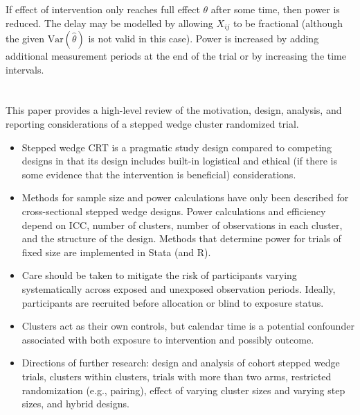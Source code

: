 \documentclass{article}
\newcommand{\Var}{\mathrm{Var}}
\begin{document}
If effect of intervention only reaches full effect $\theta$ after some time, then power is reduced. The delay may be modelled by allowing $X_{ij}$ to be fractional (although the given $\Var(\hat{\theta})$ is not valid in this case). Power is increased by adding additional measurement periods at the end of the trial or by increasing the time intervals.


\newpage


\section{\textcite{Hemming:2015}}

This paper provides a high-level review of the motivation, design, analysis, and reporting considerations of a stepped wedge cluster randomized trial.

\begin{itemize}

\item
Stepped wedge CRT is a pragmatic study design compared to competing designs in that its design includes built-in logistical and ethical (if there is some evidence that the intervention is beneficial) considerations.

\item
Methods for sample size and power calculations have only been described for cross-sectional stepped wedge designs. Power calculations and efficiency depend on ICC, number of clusters, number of observations in each cluster, and the structure of the design. Methods that determine power for trials of fixed size are implemented in Stata (and R).

\item
Care should be taken to mitigate the risk of participants varying systematically across exposed and unexposed observation periods. Ideally, participants are recruited before allocation or blind to exposure status.

\item
Clusters act as their own controls, but calendar time is a potential confounder associated with both exposure to intervention and possibly outcome.

\item
Directions of further research: design and analysis of cohort stepped wedge trials, clusters within clusters, trials with more than two arms, restricted randomization (e.g., pairing), effect of varying cluster sizes and varying step sizes, and hybrid designs.

\end{itemize}
\end{document}
